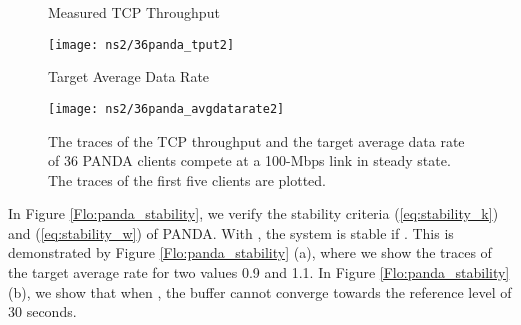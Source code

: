 \documentclass[conference]{IEEEtran}
\theoremstyle{plain}
\theoremstyle{definition}
\theoremstyle{plain}
\theoremstyle{plain}
\begin{document}
\begin{figure}
\begin{centering}
\hspace{-0.3in} \begin{minipage}[t]{1\columnwidth}\begin{center}
\hspace{0.2in}\footnotesize Measured TCP Throughput \vspace{-0.23in}

\par\end{center}

\begin{center}
\texttt{[image: ns2/36panda\_tput2]}
\par\end{center}\end{minipage}
\par\end{centering}

\begin{centering}
\vspace{0.05in}
\hspace{-0.3in} \begin{minipage}[t]{1\columnwidth}\begin{center}
\hspace{0.2in}\footnotesize Target Average Data Rate \vspace{-0.23in}

\par\end{center}

\begin{center}
\texttt{[image: ns2/36panda\_avgdatarate2]}
\par\end{center}\end{minipage}
\par\end{centering}

\centering{}\caption{The traces of the TCP throughput and the target average data rate
of 36 PANDA clients compete at a 100-Mbps link in steady state. The
traces of the first five clients are plotted.}


\label{Flo:36panda_tput} \vspace{-0.05in}
\end{figure}


In Figure \ref{Flo:panda_stability}, we verify the stability criteria
(\ref{eq:stability_k}) and (\ref{eq:stability_w}) of PANDA. With
, the system is stable if . This is demonstrated
by Figure \ref{Flo:panda_stability} (a), where we show the traces
of the target average rate  for two  values 0.9
and 1.1. In Figure \ref{Flo:panda_stability} (b), we show that when
, the buffer cannot converge towards the reference level
of 30 seconds.
\end{document}
